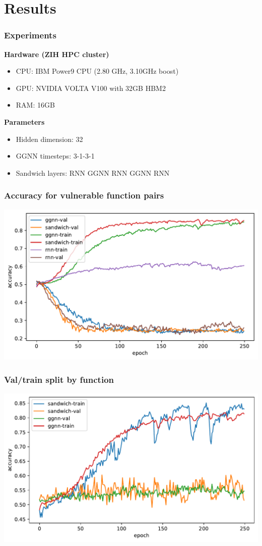 \documentclass[aspectratio=169,xcolor=table]{beamer}
\begin{document}
\section{Results}

\begin{frame}[label=current]\frametitle{Experiments}
  \textbf{Hardware (ZIH HPC cluster)}
  \begin{itemize}
    \item CPU: IBM Power9 CPU (2.80 GHz, 3.10GHz boost)
    \item GPU: NVIDIA VOLTA V100 with 32GB HBM2
    \item RAM: 16GB
  \end{itemize}

  \vspace{1em}

  \textbf{Parameters}
  \begin{itemize}
    \item Hidden dimension: 32
    \item GGNN timesteps: 3-1-3-1
    \item Sandwich layers: RNN GGNN RNN GGNN RNN
  \end{itemize}
\end{frame}


\begin{frame}\frametitle{Accuracy for vulnerable function pairs}
  \includegraphics[width=\framewidth]{media/plot-acc-paired}
\end{frame}

\begin{frame}\frametitle{Val/train split by function}
  \includegraphics[width=\framewidth]{media/plot-acc-funsplit}
\end{frame}
\end{document}
